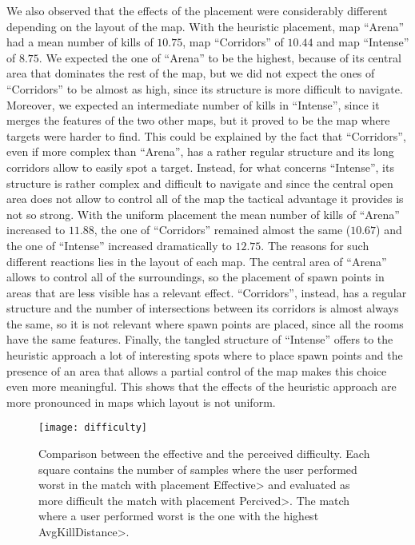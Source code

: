 We also observed that the effects of the placement were considerably different depending on the layout of the map. With the heuristic placement, map ``Arena'' had a mean number of kills of $10.75$, map ``Corridors'' of $10.44$ and map ``Intense'' of $8.75$. We expected the one of ``Arena'' to be the highest, because of its central area that dominates the rest of the map, but we did not expect the ones of ``Corridors'' to be almost as high, since its structure is more difficult to navigate. Moreover, we expected an intermediate number of kills in ``Intense'', since it merges the features of the two other maps, but it proved to be the map where targets were harder to find. This could be explained by the fact that ``Corridors'', even if more complex than ``Arena'', has a rather regular structure and its long corridors allow to easily spot a target. Instead, for what concerns ``Intense'', its structure is rather complex and difficult to navigate and since the central open area does not allow to control all of the map the tactical advantage it provides is not so strong. With the uniform placement the mean number of kills of ``Arena'' increased to $11.88$, the one of ``Corridors'' remained almost the same ($10.67$) and the one of ``Intense'' increased dramatically to $12.75$. The reasons for such different reactions lies in the layout of each map. The central area of ``Arena'' allows to control all of the surroundings, so the placement of spawn points in areas that are less visible has a relevant effect. ``Corridors'', instead, has a regular structure and the number of intersections between its corridors is almost always the same, so it is not relevant where spawn points are placed, since all the rooms have the same features. Finally, the tangled structure of ``Intense'' offers to the heuristic approach a lot of interesting spots where to place spawn points and the presence of an area that allows a partial control of the map makes this choice even more meaningful. This shows that the effects of the heuristic approach are more pronounced in maps which layout is not uniform.

\begin{figure}
\centering
\texttt{[image: difficulty]}
\caption[Comparison between the effective and the perceived difficulty.]{Comparison between the effective and the perceived difficulty. Each square contains the number of samples where the user performed worst in the match with placement \<Effective> and evaluated as more difficult the match with placement \<Percived>. The match where a user performed worst is the one with the highest \<AvgKillDistance>.}
\label{img:percived} 
\end{figure}


